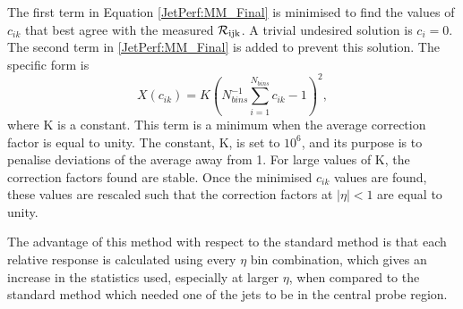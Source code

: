 The first term in Equation \ref{JetPerf:MM_Final} is minimised to find the values of $c_{ik}$ that best agree with the measured $\mathcal{R_{\rm ijk}}$. 
A trivial undesired solution is $c_i=0$. 
The second term in \ref{JetPerf:MM_Final} is added to prevent this solution.
The specific form is 
\begin{equation}
X(c_{ik})= K(N^{-1}_{bins} \sum\limits^{N_{bins}}_{i=1} c_{ik} - 1 )^2,
\end{equation}
where K is a constant.
This term is a minimum when the average correction factor is equal to unity.
The constant, K, is set to $10^6$, and its purpose is to penalise deviations of the average away from 1. 
For large values of K, the correction factors found are stable.
Once the minimised $c_{ik}$ values are found, these values are rescaled such that the correction factors at $|\eta|<1$ are equal to unity. 

The advantage of this method with respect to the standard method is that each relative response is calculated using every $\eta$ bin combination, which gives an increase in the statistics used, especially at larger $\eta$, when compared to the standard method which needed one of the jets to be in the central probe region.
